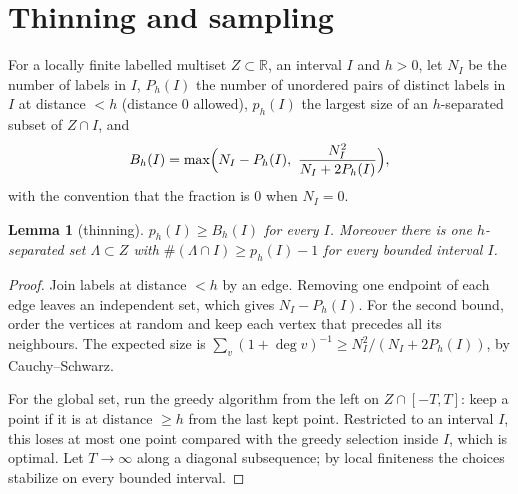 \documentclass[11pt]{amsart}
\newtheorem{lemma}[proposition]{Lemma}
\theoremstyle{definition}
\theoremstyle{remark}
\numberwithin{equation}{section}
\newcommand{\R}{\mathbb{R}}
\begin{document}
\section{Thinning and sampling}\label{sec:sampling}

For a locally finite labelled multiset $Z\subset\R$, an interval $I$ and $h>0$, let $N_I$ be the number of labels in $I$, $P_h(I)$ the number of unordered pairs of distinct labels in $I$ at distance $<h$ (distance $0$ allowed), $p_h(I)$ the largest size of an $h$-separated subset of $Z\cap I$, and
\[
B_h(I)=\max\Bigl(N_I-P_h(I),\ \frac{N_I^2}{N_I+2P_h(I)}\Bigr),
\]
with the convention that the fraction is $0$ when $N_I=0$.

\begin{lemma}[thinning]\label{lem:thin}
$p_h(I)\ge B_h(I)$ for every $I$. Moreover there is one $h$-separated set $\Lambda\subset Z$ with $\#(\Lambda\cap I)\ge p_h(I)-1$ for every bounded interval $I$.
\end{lemma}
\begin{proof}
Join labels at distance $<h$ by an edge. Removing one endpoint of each edge leaves an independent set, which gives $N_I-P_h(I)$. For the second bound, order the vertices at random and keep each vertex that precedes all its neighbours. The expected size is $\sum_v(1+\deg v)^{-1}\ge N_I^2/(N_I+2P_h(I))$, by Cauchy--Schwarz.

For the global set, run the greedy algorithm from the left on $Z\cap[-T,T]$: keep a point if it is at distance $\ge h$ from the last kept point. Restricted to an interval $I$, this loses at most one point compared with the greedy selection inside $I$, which is optimal. Let $T\to\infty$ along a diagonal subsequence; by local finiteness the choices stabilize on every bounded interval.
\end{proof}
\end{document}
